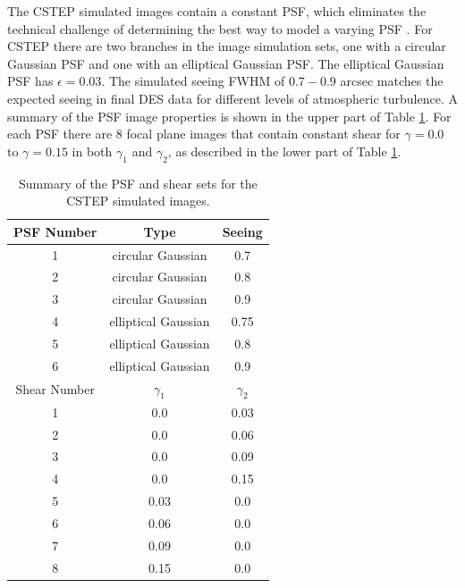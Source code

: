  The CSTEP simulated images contain a constant
PSF, which eliminates the technical challenge of determining the best
way to model a varying PSF \citep[see][for a simulation challenge for PSF reconstruction]{GREAT10star}. For CSTEP there are two
branches in the image simulation sets, one with a circular
Gaussian PSF and one with an elliptical Gaussian PSF. 
The elliptical Gaussian PSF has $ \epsilon =
0.03 $. The simulated seeing FWHM of $ 0.7 - 0.9 $ arcsec matches the expected seeing in final DES data for different levels of atmospheric turbulence.
A summary of the PSF image properties is shown in the upper part of Table \ref{table:tab2}. 
For each PSF there are 8 focal plane images that contain constant
shear for $\gamma = 0.0$ to $\gamma = 0.15$ in both
$\gamma_1$ and $\gamma_2$, as described in the lower part of Table \ref{table:tab2}.  



\begin{table}
\centering
\begin{centering}
\begin{tabular}{ccc}
\hline
PSF Number & Type & Seeing  \\
\hline
1 & circular Gaussian & 0.7 \\
2 & circular Gaussian & 0.8 \\
3 & circular Gaussian & 0.9 \\
4 & elliptical Gaussian & 0.75 \\
5 & elliptical Gaussian & 0.8  \\
6 & elliptical Gaussian & 0.9  \\
\hline
\hline
Shear Number & $ \gamma_1 $ & $ \gamma_2 $  \\
\hline
1 &  0.0 & 0.03 \\
2 &  0.0 & 0.06 \\
3 &  0.0 & 0.09 \\
4 &  0.0 & 0.15 \\
5 &  0.03 & 0.0 \\
6 &  0.06 & 0.0 \\
7 &  0.09 & 0.0 \\
8 &  0.15 & 0.0 \\
\hline
\end{tabular}
\end{centering}
\caption{ Summary of the PSF and shear sets for the CSTEP simulated images. }
\label{table:tab2}
\end{table}
